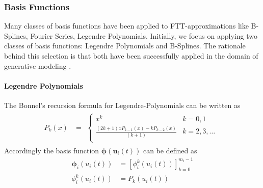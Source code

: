 \documentclass[11pt]{article}
\begin{document}


    \subsubsection{Basis Functions}
    Many classes of basis functions have been applied to FTT-approximations like B-Splines, Fourier Series,
    \cite{novikov2022tensortrain} Legendre Polynomials\cite{sommer2024generative}.
    Initially, we focus on applying two classes of basis functions: Legendre Polynomials and B-Splines.
    The rationale behind this selection is that both have been successfully applied in the domain of generative modeling
    \cite{novikov2022tensortrain,sommer2024generative}.


    \paragraph{Legendre Polynomials}
    The Bonnel's recursion formula for Legendre-Polynomials can be written as
    \begin{equation}
        \label{eq:legendre-poly-recursion}
        \begin{aligned}
            P_{k}(x)&=
            \begin{aligned}
                \begin{cases}
                    x^{k} & k=0,1 \\
                    \frac{(2 k+1)x P_{k-1}(x)-k P_{k-2}(x)}{(k + 1)} & k=2,3,\dots \\
                \end{cases}
            \end{aligned}
        \end{aligned}
    \end{equation}
    Accordingly the basis function $\bm{\phi}(\mathbf{u}_i(t))$ can be defined as
    \begin{equation}
        \label{eq:ftt-basis-legendre-polynomials}
        \begin{aligned}
            \bm{\phi}_i(u_i(t))&=[\phi_i^k(u_i(t))]_{k=0}^{m_i-1} \\
            \phi_i^k(u_i(t)) &= P_{k}(u_i(t))
        \end{aligned}
    \end{equation}
\end{document}
